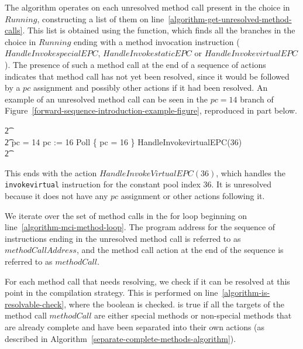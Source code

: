 The algorithm operates on each unresolved method call present in the
choice in $Running$, constructing a list of them on
line~\ref{algorithm-get-unresolved-method-calls}.
This list is obtained using the 
function, which finds all the branches in the choice in $Running$
ending with a method invocation instruction ($HandleInvokespecialEPC$,
$HandleInvokestaticEPC$ or $HandleInvokevirtualEPC$).
The presence of such a method call at the end of a sequence of actions
indicates that method call has not yet been resolved, since it would
be followed by a $pc$ assignment and possibly other actions if it had
been resolved.
An example of an unresolved method call can be seen in the $pc = 14$
branch of Figure~\ref{forward-sequence-introduction-example-figure},
reproduced in part below.
\begin{circusaction}
  \t2 {} \cdots {} \\
  \t2 {} \circelse pc = 14 \circthen \cdots \circseq pc := 16 \circseq Poll \circseq \{ pc = 16 \} \circseq HandleInvokevirtualEPC(36) \\
  \t2 {} \cdots {}
\end{circusaction}
This ends with the action $HandleInvokeVirtualEPC(36)$, which handles
the \texttt{invokevirtual} instruction for the constant pool index
$36$.
It is unresolved because it does not have any $pc$ assignment or other
actions following it.

We iterate over the set of method calls in the for loop beginning on
line~\ref{algorithm-mci-method-loop}.
The program address for the sequence of instructions ending in the
unresolved method call is referred to as $methodCallAddress$, and the
method call action at the end of the sequence is referred to as
$methodCall$.

For each method call that needs resolving, we check if it can be
resolved at this point in the compilation strategy.
This is performed on line~\ref{algorithm-is-resolvable-check}, where
the boolean  is checked.
 is true if all the targets of the method
call $methodCall$ are either special methods or non-special methods
that are already complete and have been separated into their own
actions (as described in
Algorithm~\ref{separate-complete-methods-algorithm}).


